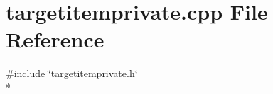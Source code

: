 \section{targetitemprivate.\+cpp File Reference}
\label{items_2targetitemprivate_8cpp}
{\ttfamily \#include \char`\"{}targetitemprivate.\+h\char`\"{}}\\*
